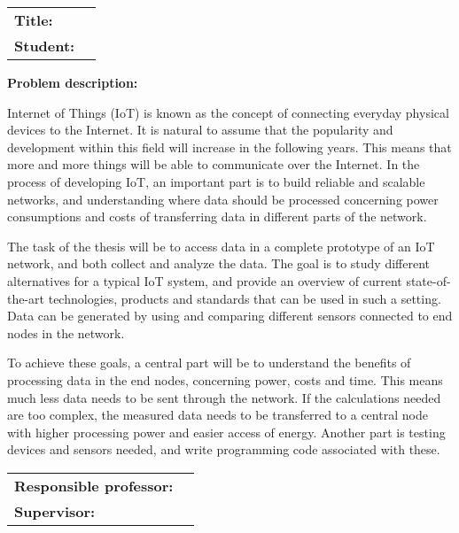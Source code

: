 \begin{titlingpage}

\noindent
\begin{tabular}{@{}p{4cm}l}
\textbf{Title:} 	& \thetitle \\
\textbf{Student:}	& \theauthor \\
\end{tabular}

\vspace{4ex}
\noindent\textbf{Problem description:}
\vspace{2ex}

\noindent Internet of Things (IoT) is known as the concept of connecting everyday physical devices to the Internet. It is natural to assume that the popularity and development within this field will increase in the following years. This means that more and more things will be able to communicate over the Internet. In the process of developing IoT, an important part is to build reliable and scalable networks, and understanding where data should be processed concerning power consumptions and costs of transferring data in different parts of the network. 

\noindent The task of the thesis will be to access data in a complete prototype of an IoT network, and both collect and analyze the data. The goal is to study different alternatives for a typical IoT system, and provide an overview of current state-of-the-art technologies, products and standards that can be used in such a setting. Data can be generated by using and comparing different sensors connected to end nodes in the network.

\noindent To achieve these goals, a central part will be to understand the benefits of processing data in the end nodes, concerning power, costs and time. This means much less data needs to be sent through the network. If the calculations needed are too complex, the measured data needs to be transferred to a central node with higher processing power and easier access of energy. Another part is testing devices and sensors needed, and write programming code associated with these. 

\vspace{6ex}

\noindent
\begin{tabular}{@{}p{4cm}l}
\textbf{Responsible professor:} 	& \theprofessor \\
\textbf{Supervisor:}			& \thesupervisor \\
\end{tabular}

\end{titlingpage}